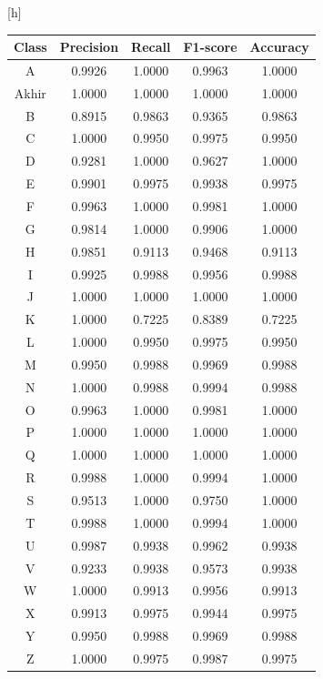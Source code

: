 \begin{center}[h]
	\begin{table}[htbp]
	\centering
	\label{tbl:TabelModelCNN}
	\begin{tabular}{|c|c|c|c|c|}
	\hline
	Class & Precision & Recall & F1-score & Accuracy \\
	\hline
	A & 0.9926 & 1.0000 & 0.9963 & 1.0000 \\
	Akhir & 1.0000 & 1.0000 & 1.0000 & 1.0000 \\
	B & 0.8915 & 0.9863 & 0.9365 & 0.9863 \\
	C & 1.0000 & 0.9950 & 0.9975 & 0.9950 \\
	D & 0.9281 & 1.0000 & 0.9627 & 1.0000 \\
	E & 0.9901 & 0.9975 & 0.9938 & 0.9975 \\
	F & 0.9963 & 1.0000 & 0.9981 & 1.0000 \\
	G & 0.9814 & 1.0000 & 0.9906 & 1.0000 \\
	H & 0.9851 & 0.9113 & 0.9468 & 0.9113 \\
	I & 0.9925 & 0.9988 & 0.9956 & 0.9988 \\
	J & 1.0000 & 1.0000 & 1.0000 & 1.0000 \\
	K & 1.0000 & 0.7225 & 0.8389 & 0.7225 \\
	L & 1.0000 & 0.9950 & 0.9975 & 0.9950 \\
	M & 0.9950 & 0.9988 & 0.9969 & 0.9988 \\
	N & 1.0000 & 0.9988 & 0.9994 & 0.9988 \\
	O & 0.9963 & 1.0000 & 0.9981 & 1.0000 \\
	P & 1.0000 & 1.0000 & 1.0000 & 1.0000 \\
	Q & 1.0000 & 1.0000 & 1.0000 & 1.0000 \\
	R & 0.9988 & 1.0000 & 0.9994 & 1.0000 \\
	S & 0.9513 & 1.0000 & 0.9750 & 1.0000 \\
	T & 0.9988 & 1.0000 & 0.9994 & 1.0000 \\
	U & 0.9987 & 0.9938 & 0.9962 & 0.9938 \\
	V & 0.9233 & 0.9938 & 0.9573 & 0.9938 \\
	W & 1.0000 & 0.9913 & 0.9956 & 0.9913 \\
	X & 0.9913 & 0.9975 & 0.9944 & 0.9975 \\
	Y & 0.9950 & 0.9988 & 0.9969 & 0.9988 \\
	Z & 1.0000 & 0.9975 & 0.9987 & 0.9975 \\
	\hline
	\end{tabular}
	\end{table}
\end{center}


